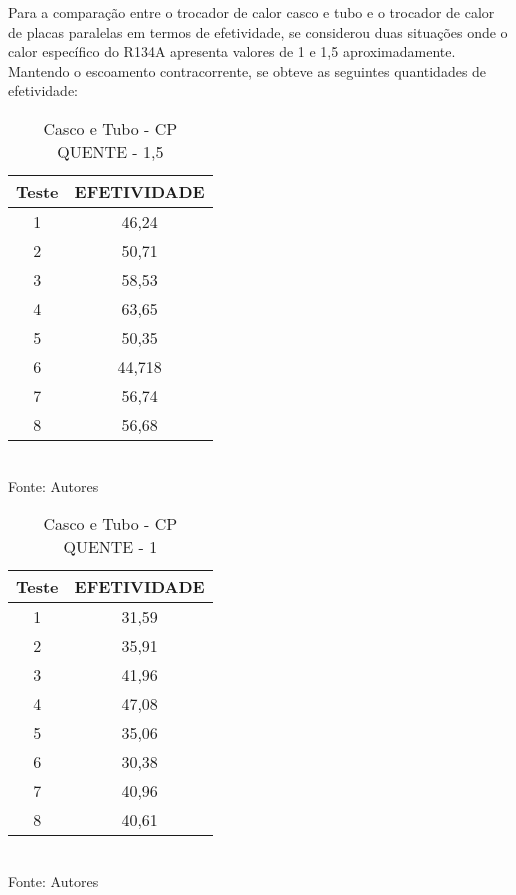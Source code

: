 \documentclass[a4paper,12pt,oneside]{article}
\begin{document}
\begin{flushright}
Para a comparação entre o trocador de calor casco e tubo e o trocador de calor de placas paralelas em termos de efetividade, se considerou duas situações onde o calor específico do R134A apresenta valores de 1 e 1,5 aproximadamente. Mantendo o escoamento contracorrente, se obteve as seguintes quantidades de efetividade:
\pagebreak
\clearpage
\newpage
\begin{table}
	\caption{Casco e Tubo - CP QUENTE - 1,5}
	\vspace{0.8cm}
	\centering
	\begin{tabular}{| c | c |}
		\hline
		Teste & EFETIVIDADE  \\
		\hline
		1 & 46,24 \\
		\hline
		2 & 50,71 \\
		\hline
		3 & 58,53  \\
		\hline
		4 & 63,65 \\
		\hline
		5 & 50,35 \\
		\hline
		6 & 44,718\\
		\hline
		7 & 56,74\\
		\hline
		8 & 56,68\\
		\hline
	\end{tabular}\\
	\vspace{0.8cm}
	Fonte: Autores
	\vspace{1cm}
\end{table}
\vspace{1cm}
\begin{table}
	\caption{Casco e Tubo - CP QUENTE - 1}
	\vspace{0.8cm}
	\centering
	\begin{tabular}{| c | c |}
		\hline
		Teste & EFETIVIDADE  \\
		\hline
		1 & 31,59 \\
		\hline
		2 & 35,91 \\
		\hline
		3 & 41,96  \\
		\hline
		4 & 47,08 \\
		\hline
		5 & 35,06 \\
		\hline
		6 & 30,38\\
		\hline
		7 & 40,96\\
		\hline
		8 & 40,61\\
		\hline
	\end{tabular}\\
	\vspace{0.8cm}
	Fonte: Autores
	\vspace{1cm}
\end{table}


\end{flushright}
\end{document}
